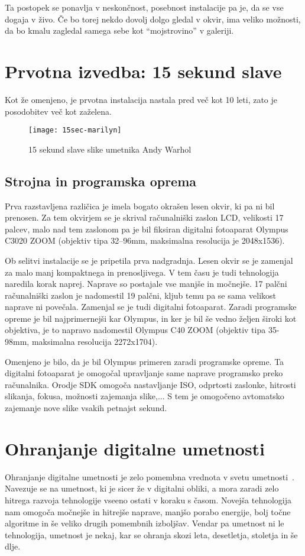 Ta postopek se ponavlja v neskončnost, posebnost instalacije pa je, da se vse dogaja v živo. Če bo torej nekdo dovolj dolgo gledal v okvir, ima veliko možnosti, da bo kmalu zagledal samega sebe kot ``mojstrovino'' v galeriji.




\chapter{Prvotna izvedba: 15 sekund slave}

Kot že omenjeno, je prvotna instalacija nastala pred več kot 10 leti, zato je posodobitev več kot zaželena.

\begin{figure}[!ht]
    \centering
    \texttt{[image: 15sec-marilyn]}
    \caption{15 sekund slave slike umetnika Andy Warhol}
    \label{fig:15sec-marilyn}
\end{figure}

\section{Strojna in programska oprema}
Prva razstavljena različica je imela bogato okrašen lesen okvir, ki pa ni bil prenosen. Za tem okvirjem se je skrival računalniški zaslon LCD, velikosti 17
palcev, malo nad tem zaslonom pa je bil fiksiran digitalni fotoaparat Olympus C3020 ZOOM (objektiv tipa 32–96mm, maksimalna resolucija je 2048x1536).

Ob selitvi instalacije se je pripetila prva nadgradnja. Lesen okvir se je
zamenjal za malo manj kompaktnega in prenosljivega. V tem času je tudi
tehnologija naredila korak naprej. Naprave so postajale vse manjše in močnejše. 17 palčni računalniški zaslon je nadomestil 19 palčni, kljub temu pa se sama velikost naprave ni povečala. Zamenjal se je tudi digitalni fotoaparat.
Zaradi programske opreme je bil najprimernejši kar Olympus, in ker je bil še
vedno željen široki kot objektiva, je to napravo nadomestil Olympus C40 ZOOM (objektiv tipa 35-98mm, maksimalna resolucija 2272x1704).

Omenjeno je bilo, da je bil Olympus primeren zaradi programske opreme. Ta
digitalni fotoaparat je omogočal upravljanje same naprave programsko preko
računalnika. Orodje SDK omogoča nastavljanje ISO, odprtosti zaslonke, hitrosti slikanja, fokusa, možnosti zajemanja slike,... S tem je omogočeno avtomatsko
zajemanje nove slike vsakih petnajst sekund.


\chapter{Ohranjanje digitalne umetnosti}
Ohranjanje digitalne umetnosti je zelo pomembna vrednota v svetu
umetnosti~\cite{ZKM}. Navezuje se na umetnost, ki je sicer že v digitalni obliki,
a mora zaradi zelo hitrega razvoja tehnologije vseeno ostati v koraku s časom. Novejša tehnologija nam omogoča močnejše in hitrejše naprave, manjšo
porabo energije, bolj točne algoritme in še veliko drugih pomembnih izboljšav.
Vendar pa umetnost ni le tehnologija, umetnost je nekaj, kar se ohranja skozi leta, desetletja, stoletja in še dlje.

